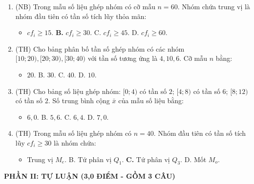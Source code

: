 \documentclass[12pt, a4paper]{article}
\begin{document}
\begin{enumerate}[leftmargin=0.6cm]
    \item (NB) Trong mẫu số liệu ghép nhóm có cỡ mẫu $n = 60$. Nhóm chứa trung vị là nhóm đầu tiên có tần số tích lũy thỏa mãn:
    \begin{itemize}[leftmargin=0.6cm]
        \item[A.] $cf_i \ge 15$. \quad \textbf{B.} $cf_i \ge 30$. \quad C. $cf_i \ge 45$. \quad D. $cf_i \ge 60$.
    \end{itemize}

    \item (TH) Cho bảng phân bố tần số ghép nhóm có các nhóm $[10; 20), [20; 30), [30; 40)$ với tần số tương ứng là $4, 10, 6$. Cỡ mẫu $n$ bằng:
    \begin{itemize}[leftmargin=0.6cm]
        \item[\textbf{A.}] $20$. \quad B. $30$. \quad C. $40$. \quad D. $10$.
    \end{itemize}

    \item (TH) Cho bảng số liệu ghép nhóm: $[0; 4)$ có tần số $2$; $[4; 8)$ có tần số $6$; $[8; 12)$ có tần số $2$. Số trung bình cộng $\bar{x}$ của mẫu số liệu bằng:
    \begin{itemize}[leftmargin=0.6cm]
        \item[\textbf{A.}] $6{,}0$. \quad B. $5{,}6$. \quad C. $6{,}4$. \quad D. $7{,}0$.
    \end{itemize}

    \item (TH) Trong mẫu số liệu ghép nhóm có $n = 40$. Nhóm đầu tiên có tần số tích lũy $cf_i \ge 30$ là nhóm chứa:
    \begin{itemize}[leftmargin=0.6cm]
        \item[A.] Trung vị $M_e$. \quad B. Tứ phân vị $Q_1$. \quad \textbf{C.} Tứ phân vị $Q_3$. \quad D. Mốt $M_o$.
    \end{itemize}
\end{enumerate}

\vspace{5pt}

\noindent \textbf{PHẦN II: TỰ LUẬN (3,0 ĐIỂM - GỒM 3 CÂU)}
\end{document}
